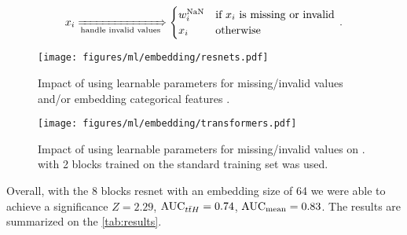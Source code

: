 \begin{equation}
    x_i \xRightarrow[\text{handle invalid values}]{} \begin{cases}
        w^\text{NaN}_i & \text{if } x_i \text{ is missing or invalid} \\
        x_i            & \text{otherwise}
    \end{cases}\,.
\end{equation}

\begin{figure}[htb]
    \centering
    \texttt{[image: figures/ml/embedding/resnets.pdf]}
    \caption{Impact of using learnable parameters for missing/invalid values and/or embedding categorical features .}
    \label{fig:learnable-nan-w-resnets}
\end{figure}

\begin{figure}[htb]
    \centering
    \texttt{[image: figures/ml/embedding/transformers.pdf]}
    \caption[Impact of using learnable parameters for missing/invalid values on .]
    {Impact of using learnable parameters for missing/invalid values on \ftts. \ftt with 2 blocks trained on the
        standard training set \ttrn was used.}
    \label{fig:learnable-nan-w-transformers}
\end{figure}

Overall, with the 8 blocks \gls{resnet} with an embedding size of 64 we were able to achieve a significance $Z = 2.29$,
$\text{AUC}_{t\bar{t}H} = 0.74$, $\text{AUC}_\text{mean} = 0.83$. The results are summarized on the \autoref{tab:results}.